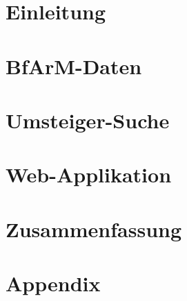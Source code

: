 \documentclass[german,version-2020-11]{uzl-thesis}
\begin{document}
%

\chapter{Einleitung} 

\chapter{BfArM-Daten} 

\chapter{Umsteiger-Suche} 

\chapter{Web-Applikation} 

\chapter{Zusammenfassung} 

\newpage


\appendix
\chapter{Appendix}

%
\newpage

\newpage

\end{document}
